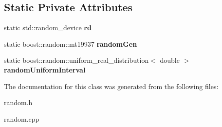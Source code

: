 \subsection*{Static Private Attributes}
\begin{DoxyCompactItemize}
\item 
static std\+::random\+\_\+device {\bfseries rd}\hypertarget{classRandom_a7206399225b174d8a582fbe005fdd147}{}\label{classRandom_a7206399225b174d8a582fbe005fdd147}

\item 
static boost\+::random\+::mt19937 {\bfseries random\+Gen}\hypertarget{classRandom_a87c5a2f785d8bc7ee8710c90be207e0f}{}\label{classRandom_a87c5a2f785d8bc7ee8710c90be207e0f}

\item 
static boost\+::random\+::uniform\+\_\+real\+\_\+distribution$<$ double $>$ {\bfseries random\+Uniform\+Interval}\hypertarget{classRandom_a8855414604d169c7a0a3b283f353a315}{}\label{classRandom_a8855414604d169c7a0a3b283f353a315}

\end{DoxyCompactItemize}


The documentation for this class was generated from the following files\+:\begin{DoxyCompactItemize}
\item 
random.\+h\item 
random.\+cpp\end{DoxyCompactItemize}
